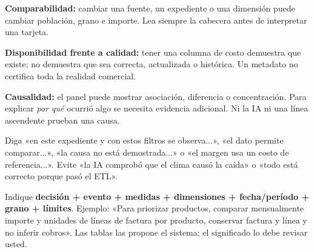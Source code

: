 \textbf{Comparabilidad:} cambiar una fuente, un expediente o una dimensión puede cambiar población, grano e importe. Lea siempre la cabecera antes de interpretar una tarjeta.

\textbf{Disponibilidad frente a calidad:} tener una columna de costo demuestra que existe; no demuestra que sea correcta, actualizada o histórica. Un metadato no certifica toda la realidad comercial.

\textbf{Causalidad:} el panel puede mostrar asociación, diferencia o concentración. Para explicar \emph{por qué} ocurrió algo se necesita evidencia adicional. Ni la IA ni una línea ascendente prueban una causa.
\begin{note}
Diga «en este expediente y con estos filtros se observa...», «el dato permite comparar...», «la causa no está demostrada...» o «el margen usa un costo de referencia...». Evite «la IA comprobó que el clima causó la caída» o «todo está correcto porque pasó el ETL».
\end{note}
Indique \textbf{decisión + evento + medidas + dimensiones + fecha/período + grano + límites}. Ejemplo: «Para priorizar productos, comparar mensualmente importe y unidades de líneas de factura por producto, conservar factura y línea y no inferir cobros». Las tablas las propone el sistema; el significado lo debe revisar usted.

